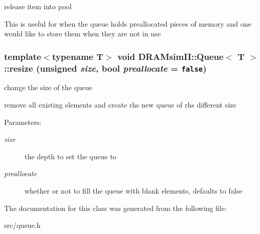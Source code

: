 release item into pool 

This is useful for when the queue holds preallocated pieces of memory and one would like to store them when they are not in use 
\subsubsection[{resize}]{\setlength{\rightskip}{0pt plus 5cm}template$<$typename T$>$ void {\bf DRAMsimII::Queue}$<$ T $>$::resize (unsigned {\em size}, \/  bool {\em preallocate} = {\tt false})\hspace{0.3cm}{\tt  [inline]}}\label{class_d_r_a_msim_i_i_1_1_queue_ba5258156502bfb99cff932324a71412}


change the size of the queue 

remove all existing elements and create rhs new queue of rhs different size \begin{Desc}
\item[Parameters:]
\begin{description}
\item[{\em size}]the depth to set the queue to \item[{\em preallocate}]whether or not to fill the queue with blank elements, defaults to false \end{description}
\end{Desc}


The documentation for this class was generated from the following file:\begin{CompactItemize}
\item 
src/queue.h\end{CompactItemize}

